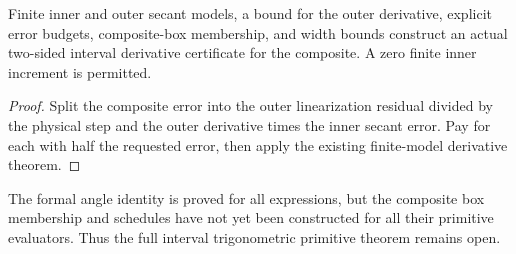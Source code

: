 \begin{theorem}
\label{thm:primitive-finite-change-of-variables}
\leanok
Finite inner and outer secant models, a bound for the outer derivative,
explicit error budgets, composite-box membership, and width bounds construct
an actual two-sided interval derivative certificate for the composite.
A zero finite inner increment is permitted.
\end{theorem}
\begin{proof}\leanok
Split the composite error into the outer linearization residual divided by
the physical step and the outer derivative times the inner secant error.
Pay for each with half the requested error, then apply the existing
finite-model derivative theorem.
\end{proof}
The formal angle identity is proved for all expressions, but the composite
box membership and schedules have not yet been constructed for all their
primitive evaluators. Thus the full interval trigonometric primitive theorem
remains open.
